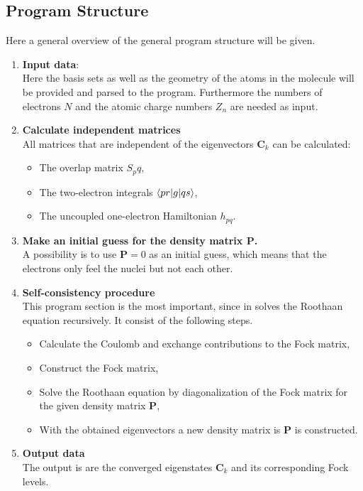 \documentclass[twoside,        %
			   11pt,			%
               BCOR10mm,       %
               ngerman,english  %
               ]{scrartcl}
\begin{document}
    
\subsection{Program Structure}
Here a general overview of the general program structure will be given.

\begin{enumerate}
	\item \textbf{Input data}:\\
	Here the basis sets as well as the geometry of the atoms in the molecule will be provided and parsed to the program. Furthermore the numbers of electrons $N$ and the atomic charge numbers $Z_n$ are needed as input.
	\item \textbf{Calculate independent matrices}\\
	All matrices that are independent of the eigenvectors $\mathbf{C}_k$ can be calculated:
	\begin{itemize}
		\item The overlap matrix $S_pq$,
		\item The two-electron integrals $\braket{pr|g|qs}$,
		\item The uncoupled one-electron Hamiltonian $h_{pq}$.
	\end{itemize}
	\item \textbf{Make an initial guess for the density matrix $\mathbf{P}$.}\\
	A possibility is to use $\mathbf{P} = 0$ as an initial guess, which means that the electrons only feel the nuclei but not each other.
	\item \textbf{Self-consistency procedure}\\
	This program section is the most important, since in solves the Roothaan equation recursively. It consist of the following steps.
	\begin{itemize}
		\item Calculate the Coulomb and exchange contributions to the Fock matrix,
		\item Construct the Fock matrix,
		\item Solve the Roothaan equation by diagonalization of the Fock matrix for the given density matrix $\mathbf{P}$,
		\item With the obtained eigenvectors a new density matrix is $\mathbf{P}$ is constructed.
	\end{itemize}
	\item \textbf{Output data}\\
	The output is are the converged eigenstates $\mathbf{C}_k$ and its corresponding Fock levels.
\end{enumerate}
\end{document}
